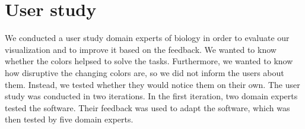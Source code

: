 \documentclass[review,journal]{vgtc}         %
\begin{document}
%
%

\section{User study}
We conducted a user study domain experts of biology in order to evaluate our visualization and to improve it based on the feedback.
We wanted to know whether the colors helpsed to solve the tasks.
Furthermore, we wanted to know how disruptive the changing colors are, so we did not inform the users about them. 
Instead, we tested whether they would notice them on their own.
The user study was conducted in two iterations. 
In the first iteration, two domain experts tested the software. 
Their feedback was used to adapt the software, which was then tested by five domain experts.
\end{document}
